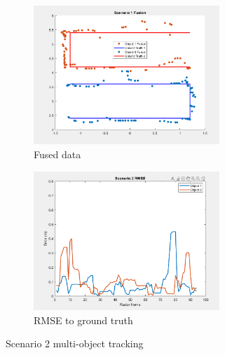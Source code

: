 \begin{figure}[!htb]
    \begin{subfigure}[b]{0.475\textwidth}%
        \includegraphics[width=7cm]{Figures/fusion_scene2.png}
        \caption{Fused data}
        \label{subfig:with_fusion_2}
    \end{subfigure}
    \begin{subfigure}[b]{0.475\textwidth}%
        \includegraphics[width=7cm]{Figures/RMSE2.png}
        \caption{RMSE to ground truth}
        \label{subfig:RMSE_2}
    \end{subfigure}
    \caption{Scenario 2 multi-object tracking}
    \label{fig:scenario_result_2}
\end{figure}
\newpage
